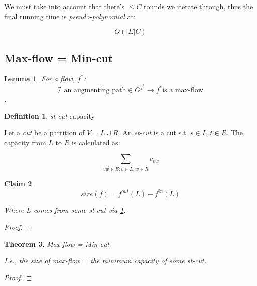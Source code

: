 \documentclass{article}
\newtheorem{theorem}{Theorem}[section]
\newtheorem{claim}[theorem]{Claim}
\newtheorem{lemma}[theorem]{Lemma}
\theoremstyle{definition}
\newtheorem{definition}{Definition}[section]
\begin{document}
We must take into account that there's $\leq C$ rounds we iterate through, thus the final running time is \textit{pseudo-polynomial} at:

$$O(|E|C)$$

\subsection{Max-flow = Min-cut}
\begin{lemma}
\label{lem:aug_path}
	For a flow, $f^*$: $$\nexists \text{ an augmenting path} \in G^{f^*} \to f^* \text{is a max-flow}$$.
\end{lemma}

\begin{definition}{\textit{st-cut} capacity}
\label{def:st_cut_cap}

Let a \textit{cut} be a partition of $V = L \cup R$. An \textit{st-cut} is a cut s.t. $s \in L, t \in R$. The capacity from $L$ to $R$ is calculated as:

$$\sum_{\overrightarrow{vw} \in E : v \in L, w \in R} c_{vw}$$
\end{definition}

\begin{claim}
$$size(f) = f^{out} (L) - f^{in} (L)$$

Where $L$ comes from some \textit{st-cut} via \ref{def:st_cut_cap}.
\end{claim}
\begin{proof}

\end{proof}

\begin{theorem}{Max-flow = Min-cut}
\label{thm:maxflowmincut}

I.e., the size of max-flow = the minimum capacity of some \textit{st-cut}.
\end{theorem}

\begin{proof}

\end{proof}
\end{document}
